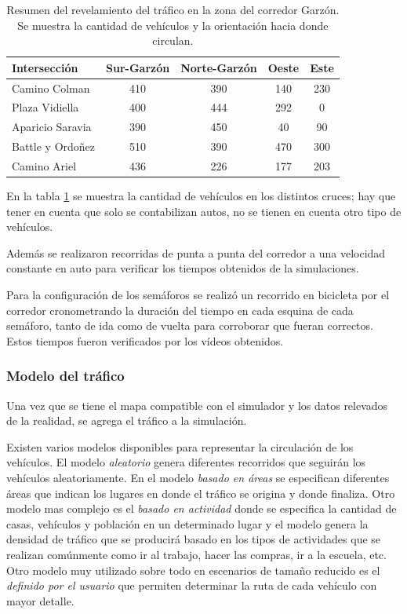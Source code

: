 \begin{table}[H]
	\renewcommand{\arraystretch}{1.2}
	\caption{Resumen del revelamiento del tráfico en la zona del corredor Garzón. Se muestra la cantidad de vehículos y la orientación hacia donde circulan.}
	\label{table:resumen_trafico}
	\centering
	\begin{tabular}{lcccc}
		\hline
		Intersección&
		Sur-Garzón& 
		Norte-Garzón & 
		Oeste &
		Este 
		\\ 
		\hline
		Camino Colman  & 410 & 390 & 140 & 230\\		
		Plaza Vidiella  & 400 & 444 & 292 & 0\\		
		Aparicio Saravia  & 390 & 450 & 40 & 90\\		
		Battle y Ordoñez  & 510 & 390 & 470 & 300 \\	
		Camino Ariel  & 436 & 226 & 177 & 203 \\													
		\hline
		
		
		\hline
	\end{tabular}
\end{table}

En la tabla \ref{table:resumen_trafico} se muestra la cantidad de vehículos en los distintos cruces; hay que tener en cuenta que solo se contabilizan autos, no se tienen en cuenta otro tipo de vehículos.

Además se realizaron recorridas de punta a punta del corredor a una velocidad constante en auto para verificar los tiempos obtenidos de la simulaciones.

Para la configuración de los semáforos se realizó un recorrido en bicicleta por el corredor cronometrando la duración del tiempo en cada esquina de cada semáforo, tanto de ida como de vuelta para corroborar que fueran correctos. Estos tiempos fueron verificados por los vídeos obtenidos.



\subsubsection{Modelo del tráfico}
Una vez que se tiene el mapa compatible con el simulador y los datos relevados de la realidad, se agrega el tráfico a la simulación.

Existen varios modelos disponibles para representar la circulación de los vehículos. El modelo \emph{aleatorio} genera diferentes recorridos que seguirán los vehículos aleatoriamente. En el modelo \emph{basado en áreas} se especifican diferentes áreas que indican los lugares en donde el tráfico se origina y donde finaliza. Otro modelo mas complejo es el \emph{basado en actividad} donde se especifica la cantidad de casas, vehículos y población en un determinado lugar y el modelo genera la densidad de tráfico que se producirá basado en los tipos de actividades que se realizan comúnmente como ir al trabajo, hacer las compras, ir a la escuela, etc. Otro modelo muy utilizado sobre todo en escenarios de tamaño reducido es el \emph{definido por el usuario} que permiten determinar la ruta de cada vehículo con mayor detalle.

